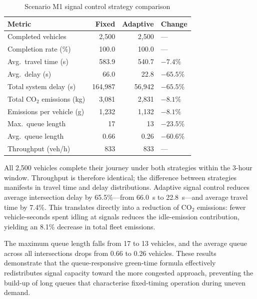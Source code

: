 \begin{table}[h]
    \centering
    \caption{Scenario M1 signal control strategy comparison}
    \label{tab:m1_results}
    \begin{tabular}{lrrl}
        \toprule
        \textbf{Metric} & \textbf{Fixed} & \textbf{Adaptive} & \textbf{Change} \\
        \midrule
        Completed vehicles         & 2{,}500  & 2{,}500  & —        \\
        Completion rate (\%)       & 100.0    & 100.0    & —        \\
        Avg.\ travel time (s)      & 583.9    & 540.7    & $-7.4\%$ \\
        Avg.\ delay (s)            & 66.0     & 22.8     & $-65.5\%$ \\
        Total system delay (s)     & 164{,}987 & 56{,}942 & $-65.5\%$ \\
        Total CO$_2$ emissions (kg)& 3{,}081  & 2{,}831  & $-8.1\%$ \\
        Emissions per vehicle (g)  & 1{,}232  & 1{,}132  & $-8.1\%$ \\
        Max.\ queue length         & 17       & 13       & $-23.5\%$ \\
        Avg.\ queue length         & 0.66     & 0.26     & $-60.6\%$ \\
        Throughput (veh/h)         & 833      & 833      & —        \\
        \bottomrule
    \end{tabular}
\end{table}

All 2{,}500 vehicles complete their journey under both strategies within the 3-hour window. Throughput is therefore identical; the difference between strategies manifests in travel time and delay distributions. Adaptive signal control reduces average intersection delay by 65.5\%---from 66.0~s to 22.8~s---and average travel time by 7.4\%. This translates directly into a reduction of CO$_2$ emissions: fewer vehicle-seconds spent idling at signals reduces the idle-emission contribution, yielding an 8.1\% decrease in total fleet emissions.

The maximum queue length falls from 17 to 13 vehicles, and the average queue across all intersections drops from 0.66 to 0.26 vehicles. These results demonstrate that the queue-responsive green-time formula effectively redistributes signal capacity toward the more congested approach, preventing the build-up of long queues that characterise fixed-timing operation during uneven demand.

